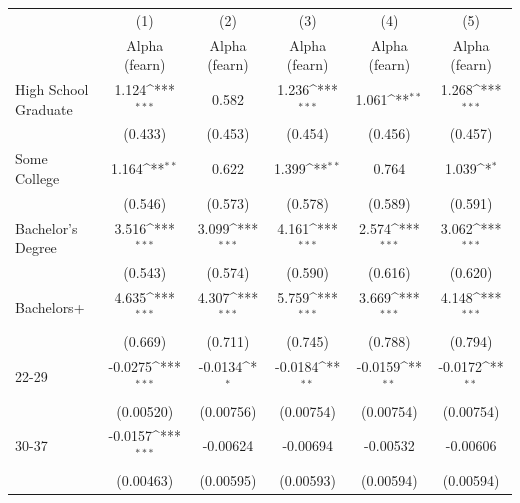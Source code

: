 {
\def\sym#1{\ifmmode^{#1}\else\(^{#1}\)\fi}
\begin{tabular}{l*{5}{c}}
\hline\hline
                    &\multicolumn{1}{c}{(1)}&\multicolumn{1}{c}{(2)}&\multicolumn{1}{c}{(3)}&\multicolumn{1}{c}{(4)}&\multicolumn{1}{c}{(5)}\\
                    &\multicolumn{1}{c}{Alpha (fearn)}&\multicolumn{1}{c}{Alpha (fearn)}&\multicolumn{1}{c}{Alpha (fearn)}&\multicolumn{1}{c}{Alpha (fearn)}&\multicolumn{1}{c}{Alpha (fearn)}\\
\hline
High School Graduate&       1.124\sym{***}&       0.582         &       1.236\sym{***}&       1.061\sym{**} &       1.268\sym{***}\\
                    &     (0.433)         &     (0.453)         &     (0.454)         &     (0.456)         &     (0.457)         \\
[1em]
Some College        &       1.164\sym{**} &       0.622         &       1.399\sym{**} &       0.764         &       1.039\sym{*}  \\
                    &     (0.546)         &     (0.573)         &     (0.578)         &     (0.589)         &     (0.591)         \\
[1em]
Bachelor's Degree   &       3.516\sym{***}&       3.099\sym{***}&       4.161\sym{***}&       2.574\sym{***}&       3.062\sym{***}\\
                    &     (0.543)         &     (0.574)         &     (0.590)         &     (0.616)         &     (0.620)         \\
[1em]
Bachelors+          &       4.635\sym{***}&       4.307\sym{***}&       5.759\sym{***}&       3.669\sym{***}&       4.148\sym{***}\\
                    &     (0.669)         &     (0.711)         &     (0.745)         &     (0.788)         &     (0.794)         \\
[1em]
22-29               &     -0.0275\sym{***}&     -0.0134\sym{*}  &     -0.0184\sym{**} &     -0.0159\sym{**} &     -0.0172\sym{**} \\
                    &   (0.00520)         &   (0.00756)         &   (0.00754)         &   (0.00754)         &   (0.00754)         \\
[1em]
30-37               &     -0.0157\sym{***}&    -0.00624         &    -0.00694         &    -0.00532         &    -0.00606         \\
                    &   (0.00463)         &   (0.00595)         &   (0.00593)         &   (0.00594)         &   (0.00594)         \\

\end{tabular}}
